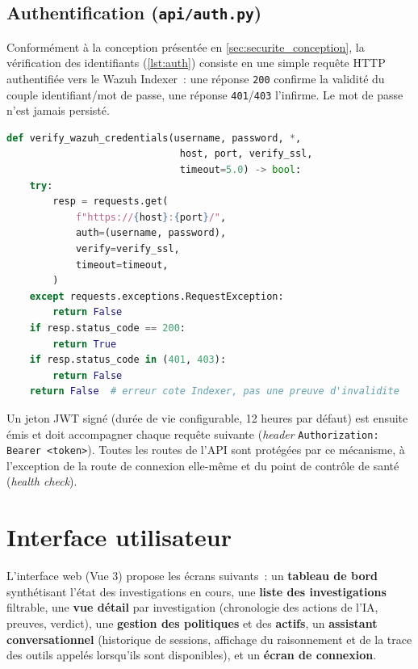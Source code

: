 \subsection{Authentification (\texttt{api/auth.py})}

Conformément à la conception présentée en \cref{sec:securite_conception},
la vérification des identifiants (\cref{lst:auth}) consiste en une simple
requête HTTP authentifiée vers le Wazuh Indexer~: une réponse \texttt{200}
confirme la validité du couple identifiant/mot de passe, une réponse
\texttt{401}/\texttt{403} l'infirme. Le mot de passe n'est jamais persisté.

\begin{lstlisting}[language=Python, caption={Vérification des identifiants
auprès du Wazuh Indexer}, label={lst:auth}]
def verify_wazuh_credentials(username, password, *,
                              host, port, verify_ssl,
                              timeout=5.0) -> bool:
    try:
        resp = requests.get(
            f"https://{host}:{port}/",
            auth=(username, password),
            verify=verify_ssl,
            timeout=timeout,
        )
    except requests.exceptions.RequestException:
        return False
    if resp.status_code == 200:
        return True
    if resp.status_code in (401, 403):
        return False
    return False  # erreur cote Indexer, pas une preuve d'invalidite
\end{lstlisting}

Un jeton JWT signé (durée de vie configurable, 12 heures par défaut) est
ensuite émis et doit accompagner chaque requête suivante
(\textit{header} \texttt{Authorization: Bearer <token>}). Toutes les routes
de l'API sont protégées par ce mécanisme, à l'exception de la route de
connexion elle-même et du point de contrôle de santé (\textit{health
check}).

\section{Interface utilisateur}

L'interface web (Vue 3) propose les écrans suivants~: un \textbf{tableau de
bord} synthétisant l'état des investigations en cours, une \textbf{liste
des investigations} filtrable, une \textbf{vue détail} par investigation
(chronologie des actions de l'IA, preuves, verdict), une \textbf{gestion
des politiques} et des \textbf{actifs}, un \textbf{assistant conversationnel}
(historique de sessions, affichage du raisonnement et de la trace des
outils appelés lorsqu'ils sont disponibles), et un \textbf{écran de
connexion}.

